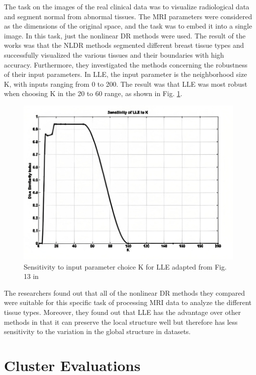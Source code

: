 The task on the images of the real clinical data was to visualize radiological data and segment normal from abnormal tissues. The MRI parameters were considered as the dimensions of the original space, and the task was to embed it into a single image. In this task, just the nonlinear DR methods were used. The result of the works was that the NLDR methods segmented different breast tissue types and successfully visualized the various tissues and their boundaries with high accuracy. Furthermore, they investigated the methods concerning the robustness of their input parameters. In LLE, the input parameter is the neighborhood size K, with inputs ranging from 0 to 200. The result was that LLE was most robust when choosing K in the 20 to 60 range, as shown in Fig. \ref{fig:LLE_robustness_related_work}.
\begin{figure}[!]
	\centering
	\includegraphics[width=\columnwidth]{images/LLE_robustness_related_work.jpg}
	\caption[Sensitivity to input parameter choice for LLE]{Sensitivity to input parameter choice K for LLE adapted from Fig. 13 in \cite{Akhbardeh12}}
    \label{fig:LLE_robustness_related_work}
\end{figure}

The researchers found out that all of the nonlinear DR methods they compared were suitable for this specific task of processing MRI data to analyze the different tissue types. Moreover, they found out that LLE has the advantage over other methods in that it can preserve the local structure well but therefore has less sensitivity to the variation in the global structure in datasets.

\section{Cluster Evaluations} \label{sec:clu_eval}

